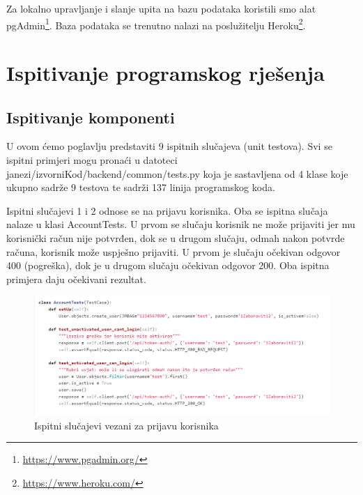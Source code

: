 			Za lokalno upravljanje i slanje upita na bazu podataka koristili smo alat pgAdmin\footnote{\url{https://www.pgadmin.org/}}. Baza podataka se trenutno nalazi na poslužitelju Heroku\footnote{\url{https://www.heroku.com/}}.
			
			
			
			
			\eject 
		
	
		\section{Ispitivanje programskog rješenja}
			

	
			
			\subsection{Ispitivanje komponenti}
			U ovom ćemo poglavlju predstaviti 9 ispitnih slučajeva (unit testova). Svi se ispitni primjeri mogu pronaći u datoteci janezi/izvorniKod/backend/common/tests.py koja je sastavljena od 4 klase koje ukupno sadrže 9 testova te sadrži 137 linija programskog koda.
			
			\vspace{5mm} %
			
			Ispitni slučajevi 1 i 2 odnose se na prijavu korisnika. Oba se ispitna slučaja nalaze u klasi AccountTests. U prvom se slučaju korisnik ne može prijaviti jer mu korisnički račun nije potvrđen, dok se u drugom slučaju, odmah nakon potvrde računa, korisnik može uspješno prijaviti. U prvom je slučaju očekivan odgovor 400 (pogreška), dok je u drugom slučaju očekivan odgovor 200. Oba ispitna primjera daju očekivani rezultat.
			
			\begin{figure}[H]
				\centering
				\includegraphics[scale=0.65]{slike/AccountTests.PNG}
				\caption{Ispitni slučajevi vezani za prijavu korisnika}
				\label{fig:promjene}
			\end{figure}
		

